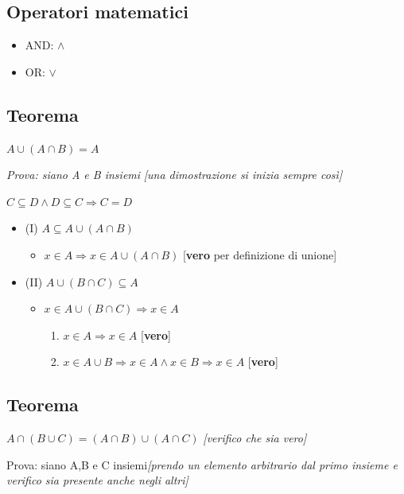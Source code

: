 \documentclass[italian]{article}
\begin{document}
\pagebreak
\subsection{Operatori matematici}
\begin{itemize}
	\item AND: $\land$
	\item OR: $\lor$
\end{itemize}

\subsection{Teorema}
$A\cup(A\cap B)=A$

\emph{Prova: siano A e B insiemi} \textit{[una dimostrazione si inizia sempre così]}

$C\subseteq D\land D\subseteq C\Rightarrow C=D$
\begin{itemize}
	\item (I) $A\subseteq A\cup(A\cap B)$
	\begin{itemize}
		\item $x\in A \Rightarrow x \in A \cup (A\cap B)$ [\textbf{vero} per definizione di unione]
	\end{itemize}
	\item (II) $A\cup (B\cap C) \subseteq A$
	\begin{itemize}
		\item $x \in A\cup (B\cap C) \Rightarrow x \in A$
		\begin{enumerate}[label=(\alph*)]
			\item $x\in A \Rightarrow x \in A$ [\textbf{vero}]
			\item $x\in A \cup B \Rightarrow x \in A \land x\in B \Rightarrow x\in A$ [\textbf{vero}]
		\end{enumerate}
	\end{itemize}
\end{itemize}

\subsection{Teorema}
$A\cap (B\cup C)=(A\cap B)\cup (A\cap C)$ \emph{[verifico che sia vero]}

Prova: siano A,B e C insiemi\textit{[prendo un elemento arbitrario dal primo insieme e verifico sia presente anche negli altri]}
\end{document}
